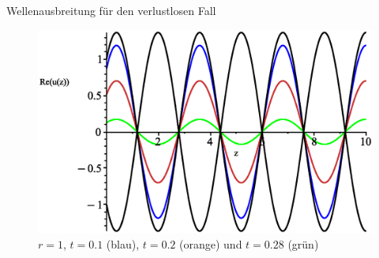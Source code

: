 \documentclass{beamer}
\begin{document}
\begin{frame}{Wellenausbreitung für den verlustlosen Fall}
\begin{figure}[H]
\begin{minipage}{0.32\textwidth}
    \end{minipage}
    \hfill
    \begin{minipage}{0.32\textwidth}
        \centering
        \includegraphics[width=\linewidth]{../graphics/Enveloppe/verlustlos/R1}
        \caption*{$r=1$, $t=0.1$ (blau), $t=0.2$ (orange) und $t=0.28$ (grün)}
    \end{minipage}
\end{figure}
\end{frame}
\end{document}
